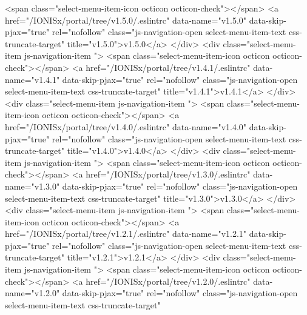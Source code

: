               <span class="select-menu-item-icon octicon octicon-check"></span>
              <a href="/IONISx/portal/tree/v1.5.0/.eslintrc"
                 data-name="v1.5.0"
                 data-skip-pjax="true"
                 rel="nofollow"
                 class="js-navigation-open select-menu-item-text css-truncate-target"
                 title="v1.5.0">v1.5.0</a>
            </div>
            <div class="select-menu-item js-navigation-item ">
              <span class="select-menu-item-icon octicon octicon-check"></span>
              <a href="/IONISx/portal/tree/v1.4.1/.eslintrc"
                 data-name="v1.4.1"
                 data-skip-pjax="true"
                 rel="nofollow"
                 class="js-navigation-open select-menu-item-text css-truncate-target"
                 title="v1.4.1">v1.4.1</a>
            </div>
            <div class="select-menu-item js-navigation-item ">
              <span class="select-menu-item-icon octicon octicon-check"></span>
              <a href="/IONISx/portal/tree/v1.4.0/.eslintrc"
                 data-name="v1.4.0"
                 data-skip-pjax="true"
                 rel="nofollow"
                 class="js-navigation-open select-menu-item-text css-truncate-target"
                 title="v1.4.0">v1.4.0</a>
            </div>
            <div class="select-menu-item js-navigation-item ">
              <span class="select-menu-item-icon octicon octicon-check"></span>
              <a href="/IONISx/portal/tree/v1.3.0/.eslintrc"
                 data-name="v1.3.0"
                 data-skip-pjax="true"
                 rel="nofollow"
                 class="js-navigation-open select-menu-item-text css-truncate-target"
                 title="v1.3.0">v1.3.0</a>
            </div>
            <div class="select-menu-item js-navigation-item ">
              <span class="select-menu-item-icon octicon octicon-check"></span>
              <a href="/IONISx/portal/tree/v1.2.1/.eslintrc"
                 data-name="v1.2.1"
                 data-skip-pjax="true"
                 rel="nofollow"
                 class="js-navigation-open select-menu-item-text css-truncate-target"
                 title="v1.2.1">v1.2.1</a>
            </div>
            <div class="select-menu-item js-navigation-item ">
              <span class="select-menu-item-icon octicon octicon-check"></span>
              <a href="/IONISx/portal/tree/v1.2.0/.eslintrc"
                 data-name="v1.2.0"
                 data-skip-pjax="true"
                 rel="nofollow"
                 class="js-navigation-open select-menu-item-text css-truncate-target"
